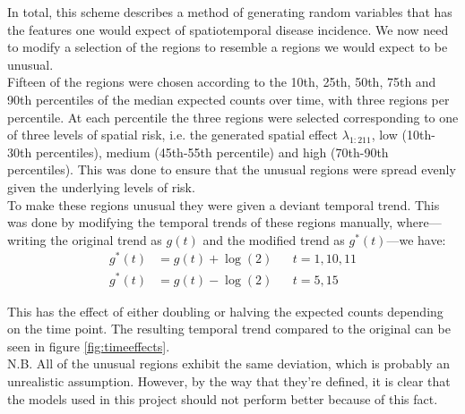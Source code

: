 \documentclass{report}
\begin{document}
In total, this scheme describes a method of generating random variables that has the features one would expect of spatiotemporal disease incidence. We now need to modify a selection of the regions to resemble a regions we would expect to be unusual. \\

Fifteen of the regions were chosen according to the 10th, 25th, 50th, 75th and 90th percentiles of the median expected counts over time, with three regions per percentile. At each percentile the three regions were selected corresponding to one of three levels of spatial risk, i.e. the generated spatial effect $\lambda_{1:211}$, low (10th-30th percentiles), medium (45th-55th percentile) and high (70th-90th percentiles). This was done to ensure that the unusual regions were spread evenly given the underlying levels of risk. \\

To make these regions unusual they were given a deviant temporal trend. This was done by modifying the temporal trends of these regions manually, where---writing the original trend as $g(t)$ and the modified trend as $g^*(t)$---we have:
\begin{align}
g^*(t) &= g(t) + \log(2) && t = 1, 10, 11 \\ 
g^*(t) &= g(t) - \log(2) && t = 5, 15
\end{align}

This has the effect of either doubling or halving the expected counts depending on the time point. The resulting temporal trend compared to the original can be seen in figure \ref{fig:timeeffects}. \\

 N.B. All of the unusual regions exhibit the same deviation, which is probably an unrealistic assumption. However, by the way that they're defined, it is clear that the models used in this project should not perform better because of this fact. 
\end{document}

